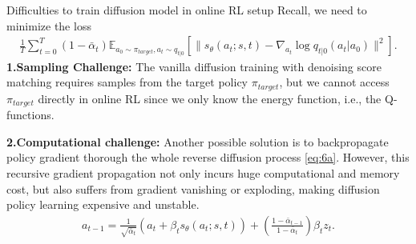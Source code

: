 \documentclass[aspectratio=169,xcolor=dvipsnames]{beamer}
\newcommand{\bE}{\mathbb{E}}
\newcommand{\te}{\theta}
\newcommand{\nal}[1]{\begin{align*}#1\end{align*}}
\newcommand{\al}[1]{\begin{align}#1\end{align}}
\begin{document}
\begin{frame}{Difficulties to train diffusion model in online RL setup}
Recall, we need to minimize the loss
\nal{
    \frac{1}{T}\sum\limits_{t=0}^{T}(1-\bar{\alpha}_t)\bE_{a_0\sim \pi_{target}, a_t\sim q_{t|0}}\left[\|s_{\te}(a_t;s,t)-\nabla_{a_t}\log q_{t|0}(a_t|a_0)\|^2\right]. 
 }
\textbf{1.Sampling Challenge:}  The vanilla diffusion training with denoising score matching requires samples from the target policy $\pi_{target}$, but we cannot access $\pi_{target}$ directly in online RL since we only know the energy function, i.e., the Q-functions.

 \textbf{2.Computational challenge:} Another possible solution is to backpropagate policy gradient thorough the whole reverse diffusion process \eqref{eq:6a}. However, this recursive gradient propagation not only incurs huge computational and memory cost, but also suffers from gradient vanishing or exploding, making diffusion policy learning expensive and unstable.
 \al{
    a_{t-1} = \frac{1}{\sqrt{\bar{\alpha}_t}}(a_t+\beta_t s_{\te}(a_t;s,t)) + \left(\frac{1-\bar{\alpha}_{t-1}}{1-\bar{\alpha}_{t}}\right) \beta_t z_t. \label{eq:6a}
}    
\end{frame}

\end{document}
